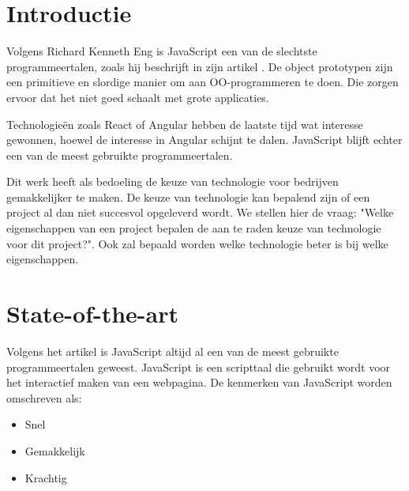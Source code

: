 
\section{Introductie} %
\label{sec:introductie}

Volgens Richard Kenneth Eng is JavaScript een van de slechtste programmeertalen, zoals hij beschrijft in zijn artikel \textcite{Richard2016}.  De object prototypen zijn een primitieve en slordige manier om aan OO-programmeren te doen. Die zorgen ervoor dat het niet goed schaalt met grote applicaties. 

Technologieën zoals React of Angular hebben de laatste tijd wat interesse gewonnen, hoewel de interesse in Angular schijnt te dalen. JavaScript blijft echter een van de meest gebruikte programmeertalen. 

Dit werk heeft als bedoeling de keuze van technologie voor bedrijven gemakkelijker te maken. De keuze van technologie kan bepalend zijn of een project al dan niet succesvol opgeleverd wordt. We stellen hier de vraag: "Welke eigenschappen van een project bepalen de aan te raden keuze van technologie voor dit project?". Ook zal bepaald worden welke technologie beter is bij welke eigenschappen.





\section{State-of-the-art}
\label{sec:state-of-the-art}

Volgens het artikel \autocite{Hackernoon2018} is JavaScript altijd al een van de meest gebruikte programmeertalen geweest. JavaScript is een scripttaal die gebruikt wordt voor het interactief maken van een webpagina. De kenmerken van JavaScript worden omschreven als:
\begin{itemize}
	\item Snel
	\item Gemakkelijk
	\item Krachtig
\end{itemize}

